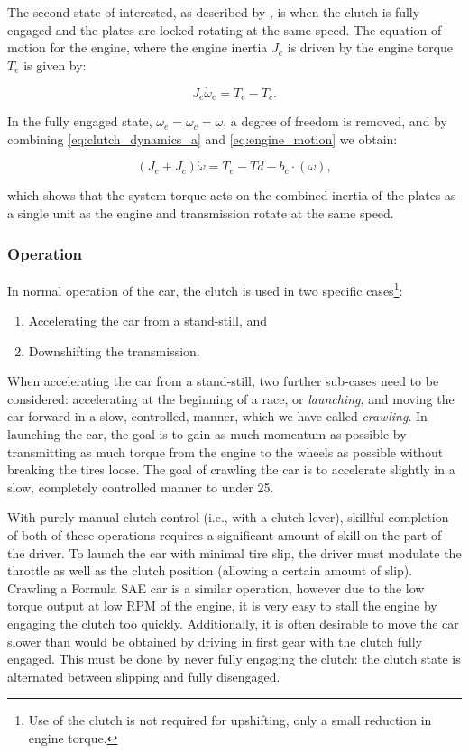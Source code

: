 The second state of interested, as described by \cite{clutch_control}, is when the clutch is fully engaged and the plates are locked rotating at the same speed. The equation of motion for the engine, where the engine inertia $J_e$ is driven by the engine torque $T_e$ is given by:

\begin{equation}\label{eq:engine_motion}
  J_e\dot{\omega}_e=T_e-T_c.
\end{equation}

In the fully engaged state, $\omega_e=\omega_c=\omega$, a degree of freedom is removed, and by combining \eqref{eq:clutch_dynamics_a} and \eqref{eq:engine_motion} we obtain:

\begin{equation}
  \left(J_e+J_c\right)\dot{\omega}=T_e-Td-b_c\cdot\left(\omega\right),
\end{equation}

which shows that the system torque acts on the combined inertia of the plates as a single unit as the engine and transmission rotate at the same speed.

\subsubsection{Operation}

In normal operation of the car, the clutch is used in two specific cases\footnote{Use of the clutch is not required for upshifting, only a small reduction in engine torque.}:
\begin{enumerate}
  \item Accelerating the car from a stand-still, and
  \item Downshifting the transmission.
\end{enumerate}

When accelerating the car from a stand-still, two further sub-cases need to be considered: accelerating at the beginning of a race, or \emph{launching}, and moving the car forward in a slow, controlled, manner, which we have called \emph{crawling}. In launching the car, the goal is to gain as much momentum as possible by transmitting as much torque from the engine to the wheels as possible without breaking the tires loose. The goal of crawling the car is to accelerate slightly in a slow, completely controlled manner to under \unit{25}{\kilo\metre\per\hour}.

With purely manual clutch control (i.e., with a clutch lever), skillful completion of both of these operations requires a significant amount of skill on the part of the driver. To launch the car with minimal tire slip, the driver must modulate the throttle as well as the clutch position (allowing a certain amount of slip). Crawling a Formula SAE car is a similar operation, however due to the low torque output at low RPM of the engine, it is very easy to stall the engine by engaging the clutch too quickly. Additionally, it is often desirable to move the car slower than would be obtained by driving in first gear with the clutch fully engaged. This must be done by never fully engaging the clutch: the clutch state is alternated between slipping and fully disengaged.

